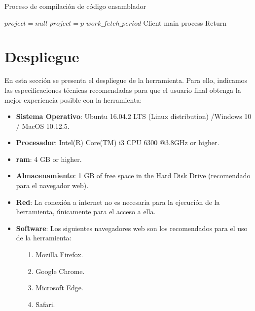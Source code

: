 \begin{algorithm}[h]
	\caption{Proceso de compilación de código ensamblador}
	\label{alg:assembly_compiler_pseudocode}
  	\scriptsize
	\begin{algorithmic}[1]
		\State $project = null$
		\State $project = p$
		\EndIf
		\EndFor
		\State {}
		\EndIf		
		\State {} $work\_fetch\_period$
		\EndWhile	
		\State {} Client main process
		\State Return
		\EndFunction
	\end{algorithmic}
\end{algorithm}


\section{Despliegue}
\label{sec:deployment}

En esta sección se presenta el despliegue de la herramienta. Para ello, indicamos las especificaciones técnicas recomendadas para que el usuario final obtenga la mejor experiencia posible con la herramienta:

\begin{itemize}

\item \textbf{Sistema Operativo}: Ubuntu 16.04.2 LTS (Linux distribution) /Windows 10 / MacOS 10.12.5.

\item \textbf{Procesador}: Intel(R) Core(TM) i3 CPU 6300 @3.8GHz or higher.

\item \textbf{\gls{ram}}: 4 GB or higher.

\item \textbf{Almacenamiento}: 1 GB of free space in the Hard Disk Drive (recomendado para el navegador web).

\item \textbf{Red}: La conexión a internet no es necesaria para la ejecución de la herramienta, únicamente para el acceso a ella.

\item \textbf{Software}: Los siguientes navegadores web son los recomendados para el uso de la herramienta:

	\begin{itemize}

	\item[1.] Mozilla Firefox.
	
	\item[2.] Google Chrome.
	
	\item[3.] Microsoft Edge.
	
	\item[4.] Safari.

	\end{itemize}

\end{itemize}

